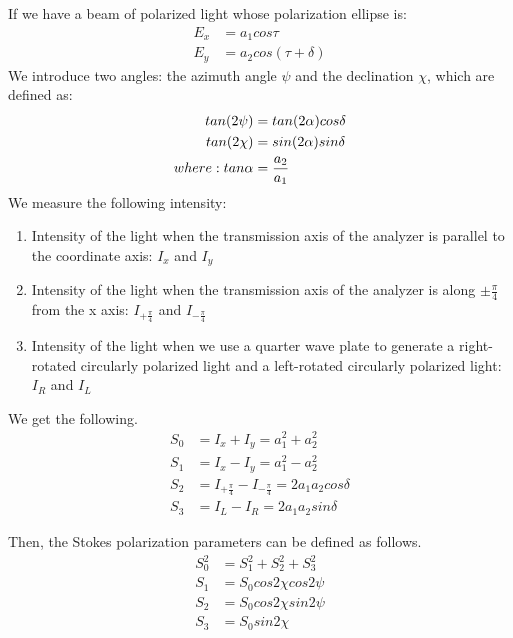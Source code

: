 \documentclass[10pt,a4paper,twocolumn,twoside,UTF8]{article}
\begin{document}
		If we have a beam of polarized light whose polarization ellipse is:
		\begin{align}
			E_x	&= a_1cos\tau \\
			E_y	&= a_2cos(\tau+\delta)
				\label{eq.4.1}
	   	\end{align}
		We introduce two angles: the azimuth angle $\psi$ and the declination $\chi$, which are defined as:
		\begin{align}
			tan(2\psi)	&= tan(2\alpha) cos\delta \label{eq.4.2.1}\\
			tan(2\chi)  &= sin(2\alpha) sin\delta \label{eq.4.2.2}\\
			where: tan\alpha &= \frac{a_2}{a_1} \notag
		\end{align}
		We measure the following intensity:
		\begin{enumerate}[label=\arabic*.]
			\item Intensity of the light when the transmission axis of the analyzer is parallel to the coordinate axis: $I_x$ and $I_y$
			\item Intensity of the light when the transmission axis of the analyzer is along $\pm \frac{\pi}{4}$ from the x axis: $I_{+\frac{\pi}{4}}$ and $I_{-\frac{\pi}{4}}$
			\item Intensity of the light when we use a quarter wave plate to generate a right-rotated circularly polarized light and a left-rotated circularly polarized light: $I_R$ and $I_L$
		\end{enumerate}
		We get the following.
		\begin{align}
			S_0 &= I_x + I_y = a^2_1 + a^2_2 \label{eq.4.3.1}\\
			S_1 &= I_x-I_y = a^2_1-a^2_2 \label{eq.4.3.2}\\
			S_2 &= I_{+\frac{\pi}{4}} - I_{-\frac{\pi}{4}} = 2 a_1 a_2cos\delta \label{eq.4.3.3}\\
			S_3 &= I_L-I_R = 2a_1 a_2 sin\delta \label{eq.4.3.4}
		\end{align}
   		
		Then, the Stokes polarization parameters can be defined as follows.
		\begin{align}
			S^2_0 &= S^2_1 + S^2_2 + S^2_3  \label{eq.4.4.1}\\
			S_1 &= S_0 cos2\chi cos2\psi  \label{eq.4.4.2}\\
			S_2 &= S_0 cos2\chi sin2\psi  \label{eq.4.4.3}\\
			S_3 &= S_0 sin2\chi  \label{eq.4.4.4}
		\end{align}
\end{document}
